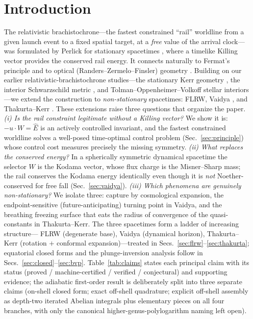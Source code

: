 \documentclass[
    aps, prd, twocolumn, superscriptaddress,
    showpacs, nofootinbib, floatfix
]{revtex4-2}
\newcommand{\Ehat}{\hat E}
\begin{document}
\maketitle

{\hypersetup{linkcolor=black}\tableofcontents}


\section{Introduction}
\label{sec:intro}
The relativistic brachistochrone---the fastest constrained ``rail'' worldline from a
given launch event to a fixed spatial target, at a \emph{free} value of the arrival
clock---was formulated by Perlick for stationary spacetimes
\cite{Perlick1991,PerlickRayOptics}, where a timelike Killing vector provides
the conserved rail energy. It connects naturally to Fermat's principle and to
optical (Randers--Zermelo--Finsler) geometry
\cite{Kovner1990,Randers1941,GibbonsWerner2008,GibbonsRanders2009,BaoRoblesShen}.
Building on our earlier relativistic-brachistochrone studies---the stationary
Kerr geometry \cite{RosignoliKerr}, the interior Schwarzschild metric
\cite{RosignoliIntSchw}, and Tolman--Oppenheimer--Volkoff stellar interiors
\cite{RosignoliTOV}---we extend the construction to \emph{non-stationary}
spacetimes: FLRW, Vaidya \cite{Vaidya1951}, and Thakurta--Kerr
\cite{Thakurta1981}.
These extensions raise three questions that organize the paper.
\emph{(i) Is the rail constraint legitimate without a Killing vector?} We show it
is: $-u\cdot W=\Ehat$ is an actively controlled invariant, and the fastest
constrained worldline solves a well-posed time-optimal control problem
(Sec.~\ref{sec:principle}) whose control cost measures precisely the missing
symmetry. \emph{(ii) What replaces the conserved energy?} In a spherically
symmetric dynamical spacetime the selector $W$ is the Kodama vector, whose flux
charge is the Misner--Sharp mass; the rail conserves the Kodama energy
identically even though it is \emph{not} Noether-conserved for free fall
(Sec.~\ref{sec:vaidya}). \emph{(iii) Which phenomena are genuinely
non-stationary?} We isolate three: capture by cosmological expansion, the
endpoint-sensitive (future-anticipating) turning point in Vaidya, and the breathing
freezing surface that eats the radius of convergence of the quasi-constants in
Thakurta--Kerr. The three spacetimes form a ladder of increasing structure---%
FLRW (degenerate base), Vaidya (dynamical horizon), Thakurta--Kerr
(rotation $+$ conformal expansion)---treated in
Secs.~\ref{sec:flrw}--\ref{sec:thakurta}; equatorial closed forms and the
plunge-inversion analysis follow in Secs.~\ref{sec:closed}--\ref{sec:bvp}.
Table~\ref{tab:claims} states each principal claim with its status (proved /
machine-certified / verified / conjectural) and supporting evidence; the adiabatic
first-order result is deliberately split into three separate claims (on-shell closed
form; exact off-shell quadrature; explicit off-shell assembly as depth-two iterated
Abelian integrals plus elementary pieces on all four branches, with only the canonical
higher-genus-polylogarithm naming left open).
\end{document}
